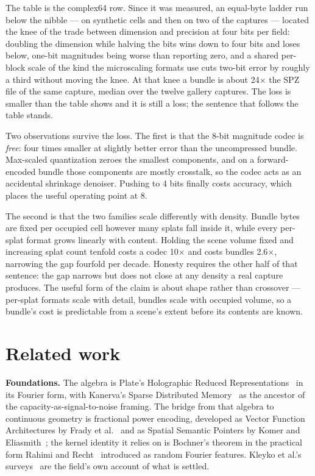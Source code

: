 \documentclass[11pt]{article}
\begin{document}
The table is the complex64 row. Since it was measured, an equal-byte
ladder run below the nibble --- on synthetic cells and then on two of
the captures --- located the knee of the trade between dimension and
precision at four bits per field: doubling the dimension while halving
the bits wins down to four bits and loses below, one-bit magnitudes
being worse than reporting zero, and a shared per-block scale of the
kind the microscaling formats use cuts two-bit error by roughly a third
without moving the knee. At that knee a bundle is about 24$\times$ the
SPZ file of the same capture, median over the twelve gallery captures.
The loss is smaller than the table shows and it is still a loss; the
sentence that follows the table stands.

Two observations survive the loss. The first is that the 8-bit magnitude
codec is \emph{free}: four times smaller at slightly better error than
the uncompressed bundle. Max-scaled quantization zeroes the smallest
components, and on a forward-encoded bundle those components are mostly
crosstalk, so the codec acts as an accidental shrinkage denoiser.
Pushing to 4 bits finally costs accuracy, which places the useful
operating point at 8.

The second is that the two families scale differently with density.
Bundle bytes are fixed per occupied cell however many splats fall inside
it, while every per-splat format grows linearly with content. Holding
the scene volume fixed and increasing splat count tenfold costs a codec
10$\times$ and costs bundles 2.6$\times$, narrowing the gap fourfold per
decade. Honesty requires the other half of that sentence: the gap
narrows but does not close at any density a real capture produces. The
useful form of the claim is about shape rather than crossover ---
per-splat formats scale with detail, bundles scale with occupied volume,
so a bundle's cost is predictable from a scene's extent before its
contents are known.

\section{Related work}

\textbf{Foundations.} The algebra is Plate's Holographic Reduced
Representations~\cite{plate1995hrr,plate2003hrr} in its Fourier form,
with Kanerva's Sparse Distributed
Memory~\cite{kanerva1988sdm,kanerva2009hdc} as the ancestor of the
capacity-as-signal-to-noise framing. The bridge from that algebra to
continuous geometry is fractional power encoding, developed as Vector
Function Architectures by Frady et al.~\cite{frady2021vfa} and as
Spatial Semantic Pointers by Komer and
Eliasmith~\cite{komer2019fractional}; the kernel identity it relies on
is Bochner's theorem in the practical form Rahimi and
Recht~\cite{rahimi2007random} introduced as random Fourier features.
Kleyko et al.'s surveys~\cite{kleyko2021survey1,kleyko2021survey2} are
the field's own account of what is settled.
\end{document}
